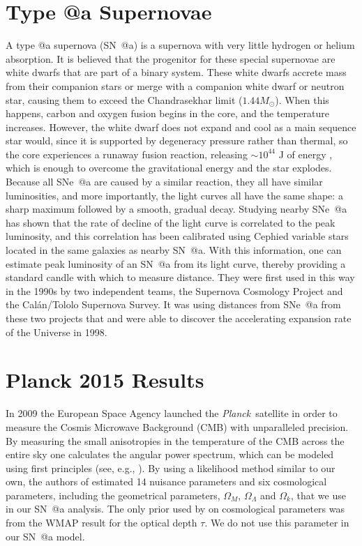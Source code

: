 \documentclass[12pt,a4paper]{article}
\makeatletter
\newcommand\Planck{{\it Planck}\ }
\newcommand*{\rom}[1]{\expandafter\@slowromancap\romannumeral #1@}
\newcommand{\sna}{\mbox{SN \rom{1}a}}
\newcommand{\snea}{\mbox{SNe \rom{1}a}}
\makeatother
\begin{document}
\section{Type \rom{1}a Supernovae}
\label{sec:SNIa}
A type \rom{1}a supernova (\sna{}) is a supernova with very little hydrogen or
helium absorption. It is believed that the progenitor for these special
supernovae are white dwarfs that are part of a binary system. These white
dwarfs accrete mass from their companion stars or merge with a companion white
dwarf or neutron star, causing them to exceed the Chandrasekhar limit
($1.44 M_\odot$). When this happens, carbon and oxygen fusion begins in the
core, and the temperature increases. However, the white dwarf does not expand
and cool as a main sequence star would, since it is supported by degeneracy
pressure rather than thermal, so the core experiences a runaway fusion
reaction, releasing $\sim 10^{44}$ J of energy \citep[see, e.g.,][chap. 18.4]{ryden2010}, 
which is enough to overcome the gravitational energy and the star explodes. Because all 
\snea{} are caused by a similar reaction, they all have similar luminosities, and more 
importantly, the light curves all have the same shape: a sharp maximum followed by a smooth, 
gradual decay. Studying nearby \snea{} has shown that the rate of decline of the light curve 
is correlated to the peak luminosity, and this correlation has been calibrated using Cephied 
variable stars located in the same galaxies as nearby \sna{}. With this information, one can 
estimate peak luminosity of an \sna{} from its light curve, thereby providing a 
standard candle with which to measure distance. They were first used in this way in the 
1990s by two independent teams, the Supernova Cosmology Project and the Cal\'{a}n/Tololo 
Supernova Survey. It was using distances from \snea{} from these two projects that 
\citet{riess1998} and \citet{perlmutter1999} were able to discover the accelerating expansion 
rate of the Universe in 1998. 

\section{Planck 2015 Results}
\label{sec:planck}
In 2009 the European Space Agency launched the \Planck satellite in order
to measure the Cosmis Microwave Background (CMB) with unparalleled precision.
By measuring the small anisotropies in the temperature of the CMB across
the entire sky one calculates the angular power spectrum, which can be
modeled using first principles (see, e.g., \citet{dodelson2003}).
By using a likelihood method similar to our own, the authors of
\citet{planck2013} estimated 14 nuisance parameters and 
six cosmological parameters, including the geometrical parameters,
$\Omega_M$, $\Omega_\Lambda$ and $\Omega_k$, that we use in our
{\sna} analysis. The only prior used by \citet{planck2013}
on cosmological parameters was from the WMAP result \citep{wmap2011}
for the optical depth $\tau$. We do not use this parameter
in our {\sna} model.
\end{document}
